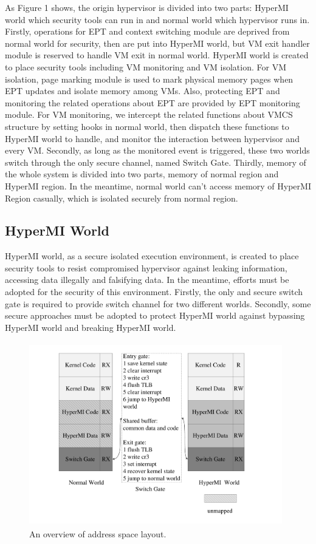 \documentclass[conference]{IEEEtran}
\begin{document}
As Figure 1 shows, the origin hypervisor is divided into two parts: HyperMI world which security tools can run in and normal world which hypervisor runs in. Firstly, operations for EPT and context switching module are deprived from normal world for security, then are put into HyperMI world, but VM exit handler module is reserved to handle VM exit in normal world. HyperMI world is created to place security tools including VM monitoring and VM isolation. For VM isolation, page marking module is used to mark physical memory pages when EPT updates and isolate memory among VMs. Also, protecting EPT and monitoring the related operations about EPT are provided by EPT monitoring module. For VM monitoring, we intercept the related functions about VMCS structure by setting hooks in normal world, then dispatch these functions to HyperMI world to handle, and monitor the interaction between hypervisor and every VM. Secondly, as long as the monitored event is triggered, these two worlds switch through the only secure channel, named Switch Gate. Thirdly, memory of the whole system is divided into two parts, memory of normal
region and HyperMI region. In the meantime, normal world can't access memory of HyperMI Region casually, which is isolated securely from normal region.


\subsection{HyperMI World} \label {HWorld}
HyperMI world, as a secure isolated execution environment, is created to place security tools to resist compromised hypervisor against leaking information, accessing data illegally and falsifying data. In the meantime, efforts must be adopted for the security of this environment. Firstly, the only and secure switch gate is required to provide switch channel for two different worlds. Secondly, some secure approaches must be adopted to protect HyperMI world against bypassing HyperMI world and breaking HyperMI world. 


\begin{figure}
\centerline{\includegraphics[width=11cm, height=8cm]{pdfvmcs2.pdf}}%
\caption{An overview of address space layout.} \label{fig2}
\end{figure}
\end{document}
